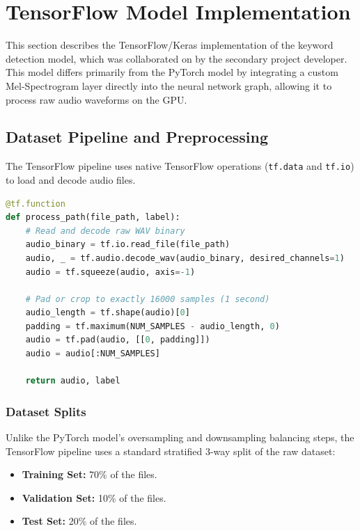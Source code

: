 \section{TensorFlow Model Implementation}

This section describes the TensorFlow/Keras implementation of the keyword detection model, which was collaborated on by the secondary project developer. This model differs primarily from the PyTorch model by integrating a custom Mel-Spectrogram layer directly into the neural network graph, allowing it to process raw audio waveforms on the GPU.

\subsection{Dataset Pipeline and Preprocessing}
The TensorFlow pipeline uses native TensorFlow operations (\texttt{tf.data} and \texttt{tf.io}) to load and decode audio files. 

\begin{lstlisting}[language=Python, caption={Native TensorFlow WAV Decoding and Alignment}, label={lst:tf_process_path}]
@tf.function
def process_path(file_path, label):
    # Read and decode raw WAV binary
    audio_binary = tf.io.read_file(file_path)
    audio, _ = tf.audio.decode_wav(audio_binary, desired_channels=1)
    audio = tf.squeeze(audio, axis=-1)

    # Pad or crop to exactly 16000 samples (1 second)
    audio_length = tf.shape(audio)[0]
    padding = tf.maximum(NUM_SAMPLES - audio_length, 0)
    audio = tf.pad(audio, [[0, padding]])
    audio = audio[:NUM_SAMPLES]

    return audio, label
\end{lstlisting}

\subsubsection{Dataset Splits}
Unlike the PyTorch model's oversampling and downsampling balancing steps, the TensorFlow pipeline uses a standard stratified 3-way split of the raw dataset:
\begin{itemize}
    \item \textbf{Training Set:} 70\% of the files.
    \item \textbf{Validation Set:} 10\% of the files.
    \item \textbf{Test Set:} 20\% of the files.
\end{itemize}

